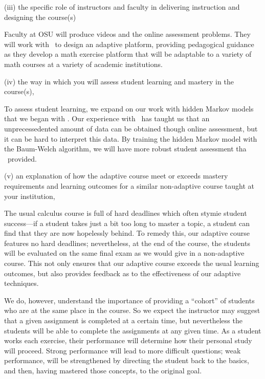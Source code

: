 \begin{question}
 (iii) the specific role of instructors and faculty in delivering
 instruction and designing the course(s)
\end{question}

Faculty at OSU will produce videos and the online assessment problems.
They will work with \gratisu\ to design an adaptive platform,
providing pedagogical guidance as they develop a math exercise
platform that will be adaptable to a variety of math courses at a
variety of academic institutions.

\begin{question}
 (iv) the way in which you will assess student learning and mastery
 in the course(s), 
\end{question}

To assess student learning, we expand on our work with hidden Markov
models that we began with \mooculus. Our experience with \mooculus\
has taught us that an unprecessedented amount of data can be obtained
though online assessment, but it can be hard to interpret this data.
By training the hidden Markov model with the Baum-Welch algorithm, we
will have more robust student assessment tha \mooculus\ provided.

\begin{question}
 (v) an explanation of how the adaptive course meet or exceeds
 mastery requirements and learning outcomes for a similar
 non-adaptive course taught at your institution, 
\end{question}

The usual calculus course is full of hard deadlines which often stymie
student success---if a student takes just a bit too long to master a
topic, a student can find that they are now hopelessly behind.  To
remedy this, our adaptive course features no hard deadlines;
nevertheless, at the end of the course, the students will be evaluated
on the same final exam as we would give in a non-adaptive course.
This not only ensures that our adaptive course exceeds the usual
learning outcomes, but also provides feedback as to the effectiveness
of our adaptive techniques.

We do, however, understand the importance of providing a ``cohort'' of
students who are at the same place in the course.  So we expect the
instructor may suggest that a given assignment is completed at a
certain time, but nevertheless the students will be able to complete
the assignments at any given time. As a student works each exercise,
their performance will determine how their personal study will
proceed.  Strong performance will lead to more difficult questions;
weak performance, will be strengthened by directing the student back
to the basics, and then, having mastered those concepts, to the
original goal.

